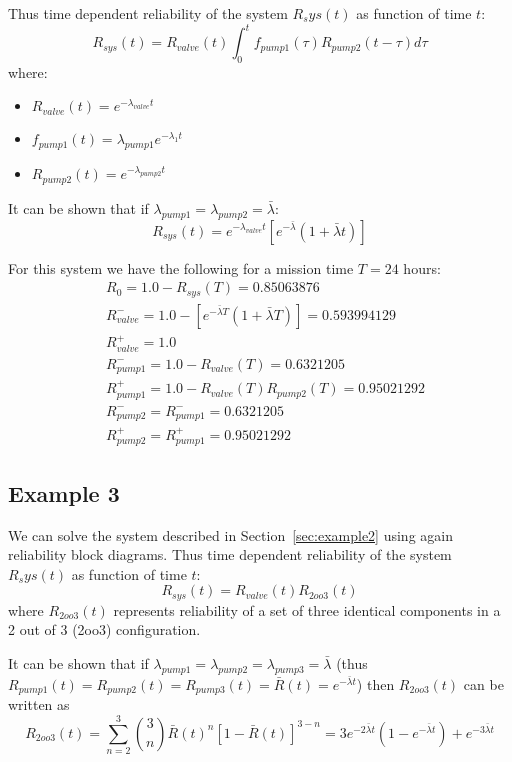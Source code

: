 Thus time dependent reliability of the system $R_sys(t)$ as function of time $t$:
\begin{equation}
  R_{sys}(t) = R_{valve}(t) \int_0^t f_{pump1}(\tau) R_{pump2}(t-\tau) d\tau
\end{equation}
where:
\begin{itemize}
  \item $R_{valve}(t) = e^{-\lambda_{valve} t}$
  \item $f_{pump1}(t) = \lambda_{pump1} e^{-\lambda_1 t}$
  \item $R_{pump2}(t) = e^{-\lambda_{pump2} t}$
\end{itemize}

It can be shown that if $\lambda_{pump1} = \lambda_{pump2} = \bar{\lambda}$:
\begin{equation}
  R_{sys}(t) = e^{-\lambda_{valve} t} [ e^{-\bar{\lambda}} (1+\bar{\lambda} t) ]
\end{equation}

For this system we have the following for a mission time $T=24$ hours:
\begin{align} 
  & R_0         = 1.0 - R_{sys}(T) = 0.85063876  \\
  & R_{valve}^- = 1.0 - [ e^{-\bar{\lambda} T} (1+\bar{\lambda} T) ] = 0.593994129 \\
  & R_{valve}^+ = 1.0  \\
  & R_{pump1}^- = 1.0 - R_{valve}(T) = 0.6321205  \\
  & R_{pump1}^+ = 1.0 - R_{valve}(T) R_{pump2}(T) = 0.95021292 \\
  & R_{pump2}^- = R_{pump1}^- = 0.6321205 \\
  & R_{pump2}^+ = R_{pump1}^+ = 0.95021292
\end{align}

\subsection*{Example 3}
\label{sec:example3Anal}

We can solve the system described in Section~\ref{sec:example2} using again reliability
block diagrams.
Thus time dependent reliability of the system $R_sys(t)$ as function of time $t$:
\begin{equation}
  R_{sys}(t) = R_{valve}(t) R_{2oo3}(t)
\end{equation}
where $R_{2oo3}(t)$ represents reliability of a set of three identical components 
in a 2 out of 3 (2oo3) configuration. 

It can be shown that if 
$\lambda_{pump1} = \lambda_{pump2} = \lambda_{pump3} = \bar{\lambda}$
(thus $R_{pump1}(t) = R_{pump2}(t) = R_{pump3}(t) = \bar{R}(t) = e^{- \bar{\lambda} t}$)
then $R_{2oo3}(t)$ can be written as
\begin{equation}
  R_{2oo3}(t) = \sum\limits_{n=2}^3 \binom{3}{n} \bar{R}(t)^n [1-\bar{R}(t)]^{3-n}
              = 3 e^{- 2 \bar{\lambda} t} (1 - e^{- \bar{\lambda} t}) + e^{- 3 \bar{\lambda} t}
\end{equation}

